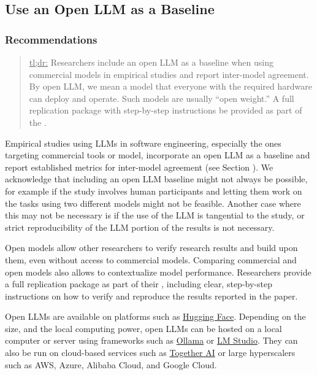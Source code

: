 



\subsection{Use an Open LLM as a Baseline}

\subsubsection{Recommendations}

\begin{quote}
\underline{tl;dr:} Researchers \should include an open LLM as a baseline when using commercial models in empirical studies and report inter-model agreement. By open LLM, we mean a model that everyone with the required hardware can deploy and operate. Such models are usually ``open weight.'' A full replication package with step-by-step instructions \should be provided as part of the \supplementarymaterial.
\end{quote}

Empirical studies using LLMs in software engineering, especially the ones targeting commercial tools or model, \should incorporate an open LLM as a baseline and report established metrics for inter-model agreement (see Section \benchmarksmetrics).
We acknowledge that including an open LLM baseline might not always be possible, for example if the study involves human participants and letting them work on the tasks using two different models might not be feasible. Another case where this may not be necessary is if the use of the LLM is tangential to the study, or strict reproducibility of the LLM portion of the results is not necessary.

Open models allow other researchers to verify research results and build upon them, even without access to commercial models.
Comparing commercial and open models also allows to contextualize model performance.
Researchers \should provide a full replication package as part of their \supplementarymaterial, including clear, step-by-step instructions on how to verify and reproduce the results reported in the paper.

Open LLMs are available on platforms such as \href{https://huggingface.co/}{Hugging Face}.
Depending on the size, and the local computing power, open LLMs can be hosted on a local computer or server using frameworks such as \href{https://ollama.com/}{Ollama} or \href{https://lmstudio.ai/}{LM Studio}.
They can also be run on cloud-based services such as \href{https://together.ai/}{Together AI} or large hyperscalers such as AWS, Azure, Alibaba Cloud, and Google Cloud.

